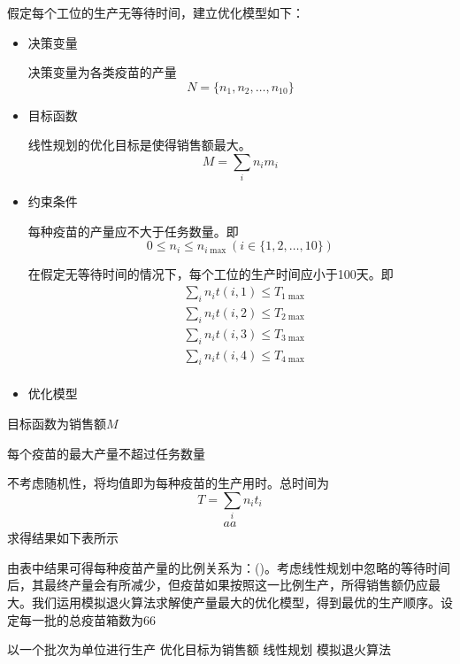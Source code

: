 \documentclass[UTF8]{ctexart}
\begin{document}
	假定每个工位的生产无等待时间，建立优化模型如下：
	\begin{itemize}
	\item 决策变量
	\par 决策变量为各类疫苗的产量
	\begin{equation}
		N=\{n_{1},n_{2},\dots,n_{10}\}
	\end{equation}
	\item 目标函数
	\par 线性规划的优化目标是使得销售额最大。
	\begin{equation}
		M=\sum_{i}n_{i}m_{i}
	\end{equation}
	\item 约束条件
	\par 每种疫苗的产量应不大于任务数量。即
	\begin{equation}
		0\leqslant n_{i}\leqslant n_{i\max}(i\in\{1,2,\dots,10\})
	\end{equation}
	\par 在假定无等待时间的情况下，每个工位的生产时间应小于100天。即
	\begin{equation}
	\begin{split}
		&\sum_{i}n_{i}t(i,1)\leqslant T_{1\max}\\
		&\sum_{i}n_{i}t(i,2)\leqslant T_{2\max}\\
		&\sum_{i}n_{i}t(i,3)\leqslant T_{3\max}\\
		&\sum_{i}n_{i}t(i,4)\leqslant T_{4\max}\\
	\end{split}
	\end{equation}
	\item 优化模型
	\end{itemize}
	目标函数为销售额$M$
	
	每个疫苗的最大产量不超过任务数量

	不考虑随机性，将均值即为每种疫苗的生产用时。总时间为
	\begin{equation}
	T=\sum_{i}n_{i}t_{i}
	\end{equation}
	\begin{equation}
	\begin{split}
	aa
	\end{split}
	\end{equation}
	求得结果如下表所示
	\par 由表中结果可得每种疫苗产量的比例关系为：()。考虑线性规划中忽略的等待时间后，其最终产量会有所减少，但疫苗如果按照这一比例生产，所得销售额仍应最大。我们运用模拟退火算法求解使产量最大的优化模型，得到最优的生产顺序。设定每一批的总疫苗箱数为66
	\par 以一个批次为单位进行生产
	优化目标为销售额
	线性规划
	模拟退火算法
\end{document}
